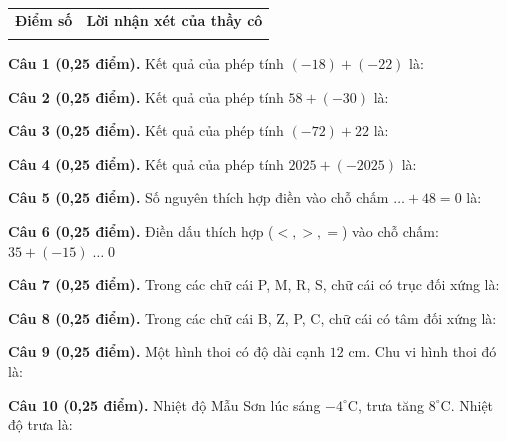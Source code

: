 \documentclass[12pt,a4paper]{article}
\begin{document}
\vspace{1.0mm}

\noindent
\begin{tabularx}{\linewidth}{|p{3.2cm}|X|}
\hline
\centering\textbf{Điểm số} & \centering\textbf{Lời nhận xét của thầy cô} \tabularnewline
\rule{0pt}{1.8cm} & \\
\hline
\end{tabularx}

\vspace{1.0mm}
\noindent\textbf{Câu 1 (0,25 điểm).} Kết quả của phép tính $(-18) + (-22)$ là: \par\vspace{0.25mm}
\noindent\textbf{Câu 2 (0,25 điểm).} Kết quả của phép tính $58 + (-30)$ là: \par\vspace{0.25mm}
\noindent\textbf{Câu 3 (0,25 điểm).} Kết quả của phép tính $(-72) + 22$ là: \par\vspace{0.25mm}
\noindent\textbf{Câu 4 (0,25 điểm).} Kết quả của phép tính $2025 + (-2025)$ là: \par\vspace{0.25mm}
\noindent\textbf{Câu 5 (0,25 điểm).} Số nguyên thích hợp điền vào chỗ chấm $\dots + 48 = 0$ là: \par\vspace{0.25mm}
\noindent\textbf{Câu 6 (0,25 điểm).} Điền dấu thích hợp ($<, >, =$) vào chỗ chấm: $35 + (-15) \; \dots \; 0$ \shortans{>}\par\vspace{0.25mm}
\noindent\textbf{Câu 7 (0,25 điểm).} Trong các chữ cái P, M, R, S, chữ cái có trục đối xứng là: \par\vspace{0.25mm}
\noindent\textbf{Câu 8 (0,25 điểm).} Trong các chữ cái B, Z, P, C, chữ cái có tâm đối xứng là: \par\vspace{0.25mm}
\noindent\textbf{Câu 9 (0,25 điểm).} Một hình thoi có độ dài cạnh $12\text{ cm}$. Chu vi hình thoi đó là: \par\vspace{0.25mm}
\noindent\textbf{Câu 10 (0,25 điểm).} Nhiệt độ Mẫu Sơn lúc sáng $-4^\circ\text{C}$, trưa tăng $8^\circ\text{C}$. Nhiệt độ trưa là: \par\vspace{0.25mm}
\end{document}
